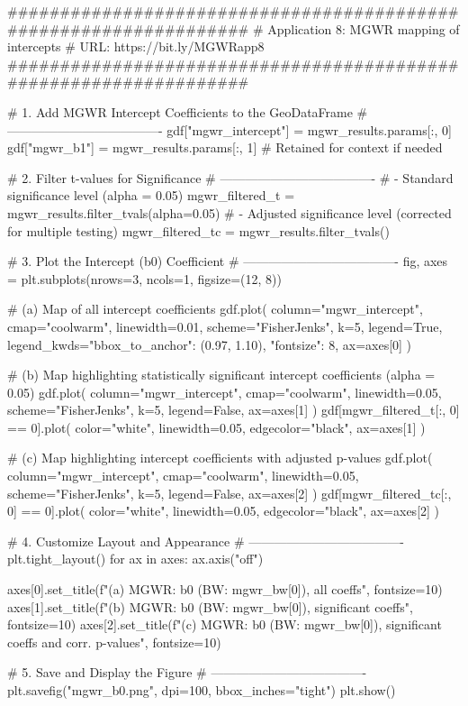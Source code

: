 \documentclass[smallextended, natbib]{svjour3}       %
\begin{document}
\begin{python}
##################################################################
# Application 8: MGWR mapping of intercepts
# URL: https://bit.ly/MGWRapp8
##################################################################

# 1. Add MGWR Intercept Coefficients to the GeoDataFrame
# -------------------------------------
gdf["mgwr_intercept"] = mgwr_results.params[:, 0]
gdf["mgwr_b1"] = mgwr_results.params[:, 1]  # Retained for context if needed

# 2. Filter t-values for Significance
# -------------------------------------
# - Standard significance level (alpha = 0.05)
mgwr_filtered_t = mgwr_results.filter_tvals(alpha=0.05)
# - Adjusted significance level (corrected for multiple testing)
mgwr_filtered_tc = mgwr_results.filter_tvals()

# 3. Plot the Intercept (b0) Coefficient
# -------------------------------------
fig, axes = plt.subplots(nrows=3, ncols=1, figsize=(12, 8))

# (a) Map of all intercept coefficients
gdf.plot(
    column="mgwr_intercept",
    cmap="coolwarm",
    linewidth=0.01,
    scheme="FisherJenks",
    k=5,
    legend=True,
    legend_kwds={"bbox_to_anchor": (0.97, 1.10), "fontsize": 8},
    ax=axes[0]
)

# (b) Map highlighting statistically significant intercept coefficients (alpha = 0.05)
gdf.plot(
    column="mgwr_intercept",
    cmap="coolwarm",
    linewidth=0.05,
    scheme="FisherJenks",
    k=5,
    legend=False,
    ax=axes[1]
)
gdf[mgwr_filtered_t[:, 0] == 0].plot(
    color="white",
    linewidth=0.05,
    edgecolor="black",
    ax=axes[1]
)

# (c) Map highlighting intercept coefficients with adjusted p-values
gdf.plot(
    column="mgwr_intercept",
    cmap="coolwarm",
    linewidth=0.05,
    scheme="FisherJenks",
    k=5,
    legend=False,
    ax=axes[2]
)
gdf[mgwr_filtered_tc[:, 0] == 0].plot(
    color="white",
    linewidth=0.05,
    edgecolor="black",
    ax=axes[2]
)

# 4. Customize Layout and Appearance
# -------------------------------------
plt.tight_layout()
for ax in axes:
    ax.axis("off")

axes[0].set_title(f"(a) MGWR: b0 (BW: {mgwr_bw[0]}), all coeffs", fontsize=10)
axes[1].set_title(f"(b) MGWR: b0 (BW: {mgwr_bw[0]}), significant coeffs", fontsize=10)
axes[2].set_title(f"(c) MGWR: b0 (BW: {mgwr_bw[0]}), significant coeffs and corr. p-values", fontsize=10)

# 5. Save and Display the Figure
# -------------------------------------
plt.savefig("mgwr_b0.png", dpi=100, bbox_inches="tight")
plt.show()    
\end{python}
\end{document}
